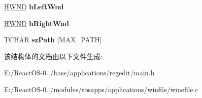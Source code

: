 \begin{DoxyCompactItemize}
\mbox{\label{struct_child_wnd_aee24586dc9632812d5443579de0337d3}} 
\hyperlink{interfacevoid}{H\+W\+ND} {\bfseries h\+Left\+Wnd}
\item 
\mbox{\label{struct_child_wnd_a96ea270603965f2f17c1582a4f446dd7}} 
\hyperlink{interfacevoid}{H\+W\+ND} {\bfseries h\+Right\+Wnd}
\item 
\mbox{\label{struct_child_wnd_af279ca32db746ba6225e6632133111e6}} 
T\+C\+H\+AR {\bfseries sz\+Path} \mbox{[}M\+A\+X\+\_\+\+P\+A\+TH\mbox{]}
\end{DoxyCompactItemize}


该结构体的文档由以下文件生成\+:\begin{DoxyCompactItemize}
\item 
E\+:/\+React\+O\+S-\/0../base/applications/regedit/main.\+h\item 
E\+:/\+React\+O\+S-\/0../modules/rosapps/applications/winfile/winefile.\+c\end{DoxyCompactItemize}

